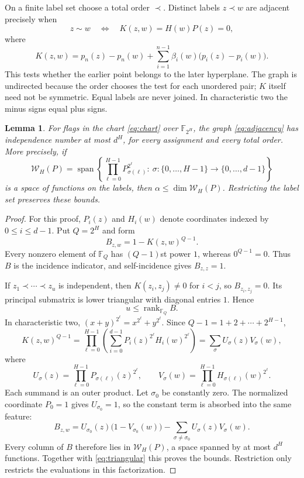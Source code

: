 \documentclass[11pt,a4paper]{article}
\newcommand{\F}{\mathbb F}
\newcommand{\Wcal}{\mathcal W}
\DeclareMathOperator{\rank}{rank}
\DeclareMathOperator{\spanop}{span}
\newtheorem{lemma}[theorem]{Lemma}
\theoremstyle{definition}
\theoremstyle{remark}
\numberwithin{equation}{section}
\begin{document}
On a finite label set choose a total order $\prec$. Distinct labels $z\prec w$ are adjacent precisely when
\begin{equation}\label{eq:adjacency}
z\sim w\quad\Longleftrightarrow\quad K(z,w)=H(w)P(z)=0,
\end{equation}
where
\begin{equation}\label{eq:kernel}
K(z,w)=p_n(z)-p_n(w)+\sum_{i=1}^{n-1}\beta_i(w)\bigl(p_i(z)-p_i(w)\bigr).
\end{equation}
This tests whether the earlier point belongs to the later hyperplane. The graph is undirected because the order chooses the test for each unordered pair; $K$ itself need not be symmetric. Equal labels are never joined. In characteristic two the minus signs equal plus signs.


\begin{lemma}\label{lem:rank}
For flags in the chart \eqref{eq:chart} over $\F_{2^H}$, the graph \eqref{eq:adjacency} has independence number at most $d^H$, for every assignment and every total order. More precisely, if
\begin{equation}\label{eq:feature-space}
\Wcal_H(P)=\spanop\left\{
\prod_{\ell=0}^{H-1}P_{\sigma(\ell)}^{2^\ell}:\
\sigma:\{0,\ldots,H-1\}\longrightarrow\{0,\ldots,d-1\}
\right\}
\end{equation}
is a space of functions on the labels, then $\alpha\le\dim\Wcal_H(P)$. Restricting the label set preserves these bounds.
\end{lemma}


\begin{proof}
For this proof, $P_i(z)$ and $H_i(w)$ denote coordinates indexed by $0\le i\le d-1$. Put $Q=2^H$ and form
\[
B_{z,w}=1-K(z,w)^{Q-1}.
\]
Every nonzero element of $\F_Q$ has $(Q-1)$st power $1$, whereas $0^{Q-1}=0$. Thus $B$ is the incidence indicator, and self-incidence gives $B_{z,z}=1$.

If $z_1\prec\cdots\prec z_u$ is independent, then $K(z_i,z_j)\ne0$ for $i<j$, so $B_{z_i,z_j}=0$. Its principal submatrix is lower triangular with diagonal entries $1$. Hence
\begin{equation}\label{eq:triangular}
u\le\rank_{\F_Q}B.
\end{equation}
In characteristic two, $(x+y)^{2^\ell}=x^{2^\ell}+y^{2^\ell}$. Since $Q-1=1+2+\cdots+2^{H-1}$,
\begin{equation}\label{eq:frobenius-factor}
K(z,w)^{Q-1}=
\prod_{\ell=0}^{H-1}\left(\sum_{i=0}^{d-1}P_i(z)^{2^\ell}H_i(w)^{2^\ell}\right)
=\sum_\sigma U_\sigma(z)V_\sigma(w),
\end{equation}
where
\[
U_\sigma(z)=\prod_{\ell=0}^{H-1}P_{\sigma(\ell)}(z)^{2^\ell},\qquad
V_\sigma(w)=\prod_{\ell=0}^{H-1}H_{\sigma(\ell)}(w)^{2^\ell}.
\]
Each summand is an outer product. Let $\sigma_0$ be constantly zero. The normalized coordinate $P_0=1$ gives $U_{\sigma_0}=1$, so the constant term is absorbed into the same feature:
\[
B_{z,w}=U_{\sigma_0}(z)\bigl(1-V_{\sigma_0}(w)\bigr)
-\sum_{\sigma\ne\sigma_0}U_\sigma(z)V_\sigma(w).
\]
Every column of $B$ therefore lies in $\Wcal_H(P)$, a space spanned by at most $d^H$ functions. Together with \eqref{eq:triangular} this proves the bounds. Restriction only restricts the evaluations in this factorization.
\end{proof}
\end{document}
